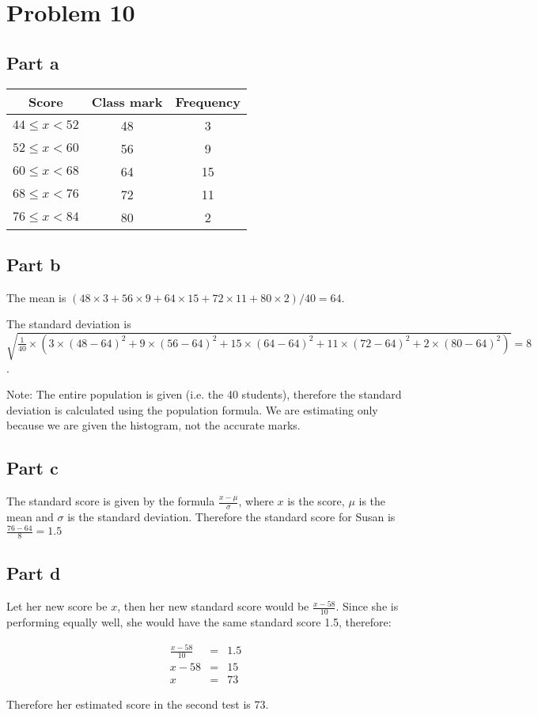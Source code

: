 \section*{Problem 10}
\subsection*{Part a}
\begin{center}
  \begin{tabular}{ |c|c|c| }
    \hline
    Score             & Class mark & Frequency \\
    \hline
    $ 44 \le x < 52 $ & 48         & 3         \\
    $ 52 \le x < 60 $ & 56         & 9         \\
    $ 60 \le x < 68 $ & 64         & 15        \\
    $ 68 \le x < 76 $ & 72         & 11        \\
    $ 76 \le x < 84 $ & 80         & 2         \\
    \hline
  \end{tabular}
\end{center}
\subsection*{Part b}
The mean is $ (48 \times 3 + 56 \times 9 + 64 \times 15 + 72 \times 11 + 80 \times 2) / 40 = 64 $.

The standard deviation is $ \sqrt{ \frac{1}{40} \times (3 \times (48 - 64)^2 + 9 \times (56 - 64)^2 + 15 \times (64 - 64)^2 + 11 \times (72 - 64)^2 + 2 \times (80 - 64)^2) } = 8 $.

Note: The entire population is given (i.e. the 40 students), therefore the standard deviation is calculated using the population formula. We are estimating only because we are given the histogram, not the accurate marks.

\subsection*{Part c}
The standard score is given by the formula $ \frac{x - \mu}{\sigma} $, where $ x $ is the score, $ \mu $ is the mean and $ \sigma $ is the standard deviation. Therefore the standard score for Susan is $ \frac{76 - 64}{8} = 1.5 $

\subsection*{Part d}
Let her new score be $ x $, then her new standard score would be $ \frac{x - 58}{10} $. Since she is performing equally well, she would have the same standard score 1.5, therefore:

\begin{eqnarray*}
  \frac{x - 58}{10} &=& 1.5 \\
             x - 58 &=& 15  \\
                 x &=& 73
\end{eqnarray*}

Therefore her estimated score in the second test is 73.

